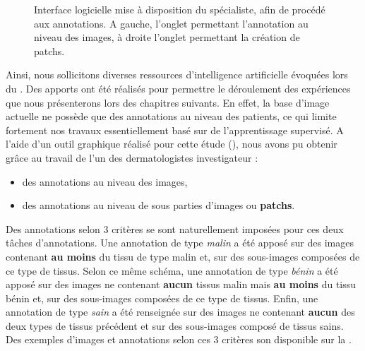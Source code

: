 \begin{figure}[H]
\begin{subfigure}{.45\textwidth}
    \end{subfigure}
    \caption{Interface logicielle mise à disposition du spécialiste, afin de procédé aux annotations. A gauche, l'onglet permettant l'annotation au niveau des images, à droite l'onglet permettant la création de patchs.}
    \label{fig:example_gui_annotation}
\end{figure}

Ainsi, nous sollicitons diverses ressources d'intelligence artificielle évoquées lors du . Des apports ont été réalisés pour permettre le déroulement des expériences que nous présenterons lors des chapitres suivants. En effet, la base d'image actuelle ne possède que des annotations au niveau des patients, ce qui limite fortement nos travaux essentiellement basé sur de l'apprentissage supervisé. A l'aide d'un outil graphique réalisé pour cette étude (), nous avons pu obtenir grâce au travail de l'un des dermatologistes investigateur :
\begin{itemize}
    \item des annotations au niveau des images,
    \item des annotations au niveau de sous parties d'images ou \textbf{patchs}.
\end{itemize}\par

Des annotations selon 3 critères se sont naturellement imposées pour ces deux tâches d'annotations. Une annotation de type \textit{malin} a été apposé sur des images contenant \textbf{au moins} du tissu de type malin et, sur des sous-images composées de ce type de tissus. Selon ce même schéma, une annotation de type \textit{bénin} a été apposé sur des images ne contenant \textbf{aucun} tissus malin mais \textbf{au moins} du tissu bénin et, sur des sous-images composées de ce type de tissus. Enfin, une annotation de type \textit{sain} a été renseignée sur des images ne contenant \textbf{aucun} des deux types de tissus précédent et sur des sous-images composé de tissus sains. Des exemples d'images et annotations selon ces 3 critères son disponible sur la .\par

